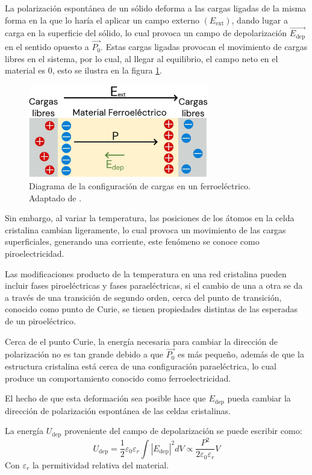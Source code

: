 \documentclass[../main.tex]{subfiles}
\begin{document}
La polarización espontánea de un sólido deforma a las cargas ligadas de la misma forma en la que lo haría el aplicar un campo externo $(E_{\text{ext}})$, dando lugar a carga en la superficie del sólido, lo cual provoca un campo de depolarización $\vec{E_\text{dep}}$ en el sentido opuesto a $\vec{P_0}$. Estas cargas ligadas provocan el movimiento de cargas libres en el sistema, por lo cual, al llegar al equilibrio, el campo neto en el material es 0, esto se ilustra en la figura \ref{fig:ferroelecdiag}.
\begin{figure}[H]
    \centering
    \includegraphics[width=0.7\textwidth]{fig/ferroelecdiag.jpg}
    \caption{Diagrama de la configuración de cargas en un ferroeléctrico. Adaptado de \cite{Qiao2021}.}
    \label{fig:ferroelecdiag}
\end{figure}
Sin embargo, al variar la temperatura, las posiciones de los átomos en la celda cristalina cambian ligeramente, lo cual provoca un movimiento de las cargas superficiales, generando una corriente, este fenómeno se conoce como piroelectricidad.

Las modificaciones producto de la temperatura en una red cristalina pueden incluir fases piroeléctricas y fases paraeléctricas, si el cambio de una a otra se da a través de una transición de segundo orden, cerca del punto de transición, conocido como punto de Curie, se tienen propiedades distintas de las esperadas de un piroeléctrico.

Cerca de el punto Curie, la energía necesaria para cambiar la dirección de polarización no es tan grande debido a que $\vec{P_{0}}$ es más pequeño, además de que la estructura cristalina está cerca de una configuración paraeléctrica, lo cual produce un comportamiento conocido como ferroelectricidad.

El hecho de que esta deformación sea posible hace que $E_\text{dep}$ pueda cambiar la dirección de polarización espontánea de las celdas cristalinas.

La energía $U_\text{dep}$ proveniente del campo de depolarización se puede escribir como:
\begin{equation}
    U_\text{dep}=\dfrac{1}{2}\varepsilon_0\varepsilon_r\int|E_\text{dep}|^2dV\propto\dfrac{P^2}{2\varepsilon_0\varepsilon_r}V
    \label{eq:energiadepolarizacion}
\end{equation}
Con $\varepsilon_r$ la permitividad relativa del material.
\end{document}
